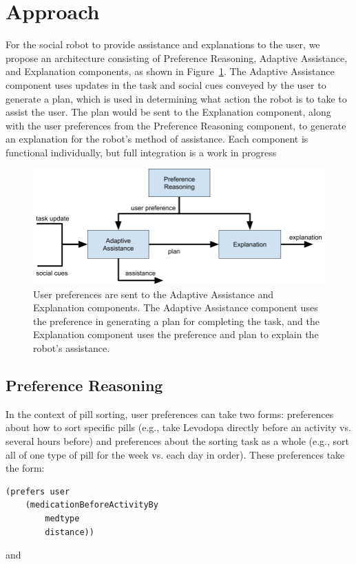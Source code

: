 \documentclass[letterpaper]{article} %
\begin{document}

\section{Approach}


For the social robot to provide assistance and explanations to the user, we propose an
architecture consisting of Preference Reasoning, Adaptive Assistance, and Explanation
components, as shown in Figure~\ref{fig:arch}.  The Adaptive Assistance component uses updates in the task and social cues conveyed by the user to generate a plan, which is used in determining what action the robot is to take to assist the user.  The plan would be sent to the Explanation component, along with the user preferences from the Preference Reasoning component, to generate an explanation for the robot's method of assistance. Each component is functional individually, but full integration is a work in progress

\begin{figure}[h]
\centering
\includegraphics[width=1.0\columnwidth]{architecture.png}
\caption{User preferences are sent to the Adaptive Assistance and Explanation components.  The Adaptive Assistance component uses the preference in generating a plan for completing the task, and the Explanation component uses the preference and plan to explain the robot's assistance.}
\label{fig:arch}
\end{figure}

\subsection{Preference Reasoning}
In the context of pill sorting, user preferences can take two forms: preferences about how to sort specific pills (e.g., take Levodopa directly before an activity vs. several hours before) and preferences about the sorting task as a whole (e.g., sort all of one type of pill for the week vs. each day in order). These preferences take the form:
 \small{
 \begin{verbatim}
(prefers user
    (medicationBeforeActivityBy
        medtype
        distance))
 \end{verbatim}}
 \noindent
 and
\end{document}
